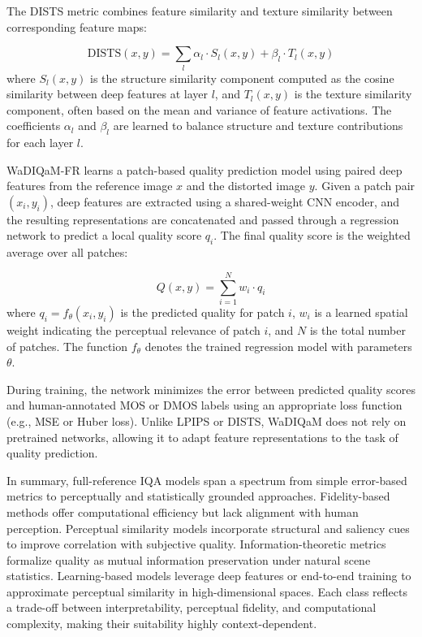 The DISTS metric combines feature similarity and texture similarity between corresponding feature maps:

\begin{equation}
\text{DISTS}(x, y) = \sum_{l} \alpha_l \cdot S_l(x, y) + \beta_l \cdot T_l(x, y)
\end{equation}
where $S_l(x, y)$ is the structure similarity component computed as the cosine similarity between deep features at layer $l$, and $T_l(x, y)$ is the texture similarity component, often based on the mean and variance of feature activations. The coefficients $\alpha_l$ and $\beta_l$ are learned to balance structure and texture contributions for each layer $l$.

WaDIQaM-FR learns a patch-based quality prediction model using paired deep features from the reference image $x$ and the distorted image $y$. Given a patch pair $(x_i, y_i)$, deep features are extracted using a shared-weight CNN encoder, and the resulting representations are concatenated and passed through a regression network to predict a local quality score $q_i$. The final quality score is the weighted average over all patches:

\begin{equation}
Q(x, y) = \sum_{i=1}^{N} w_i \cdot q_i
\end{equation}
where $q_i = f_{\theta}(x_i, y_i)$ is the predicted quality for patch $i$, $w_i$ is a learned spatial weight indicating the perceptual relevance of patch $i$, and $N$ is the total number of patches. The function $f_{\theta}$ denotes the trained regression model with parameters $\theta$.

During training, the network minimizes the error between predicted quality scores and human-annotated MOS or DMOS labels using an appropriate loss function (e.g., MSE or Huber loss). Unlike LPIPS or DISTS, WaDIQaM does not rely on pretrained networks, allowing it to adapt feature representations to the task of quality prediction.

In summary, full-reference IQA models span a spectrum from simple error-based metrics to perceptually and statistically grounded approaches. Fidelity-based methods offer computational efficiency but lack alignment with human perception. Perceptual similarity models incorporate structural and saliency cues to improve correlation with subjective quality. Information-theoretic metrics formalize quality as mutual information preservation under natural scene statistics. Learning-based models leverage deep features or end-to-end training to approximate perceptual similarity in high-dimensional spaces. Each class reflects a trade-off between interpretability, perceptual fidelity, and computational complexity, making their suitability highly context-dependent.

